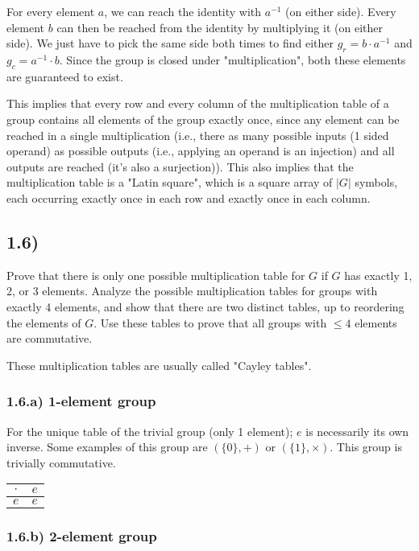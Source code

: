\documentclass[12pt, letterpaper, twoside]{report}
\begin{document}
For every element $a$, we can reach the identity with $a^{-1}$ (on either side). Every element $b$ can then be reached from the identity by multiplying it (on either side). We just have to pick the same side both times to find either $g_r = b \cdot a^{-1}$ and $g_c = a^{-1} \cdot b$. Since the group is closed under "multiplication", both these elements are guaranteed to exist.

This implies that every row and every column of the multiplication table of a group contains all elements of the group exactly once, since any element can be reached in a single multiplication (i.e., there as many possible inputs (1 sided operand) as possible outputs (i.e., applying an operand is an injection) and all outputs are reached (it's also a surjection)). This also implies that the multiplication table is a "Latin square", which is a square array of $|G|$ symbols, each occurring exactly once in each row and exactly once in each column. 



\subsection*{1.6)}

Prove that there is only one possible multiplication table for $G$ if $G$ has exactly 1, 2, or 3 elements. Analyze the possible multiplication tables for groups with exactly 4 elements, and show that there are two distinct tables, up to reordering the elements of $G$. Use these tables to prove that all groups with $\leq 4$ elements are commutative.

These multiplication tables are usually called "Cayley tables".


\subsubsection*{1.6.a) 1-element group}

For the unique table of the trivial group (only 1 element); $e$ is necessarily its own inverse. Some examples of this group are $(\{0\}, +)$ or $(\{1\}, \times)$. This group is trivially commutative.

\begin{tabular}{|c||c|}
\hline
$\cdot$ & $e$ \\
\hline \hline
$e    $ & $e$ \\
\hline
\end{tabular}


\subsubsection*{1.6.b) 2-element group}
\end{document}
